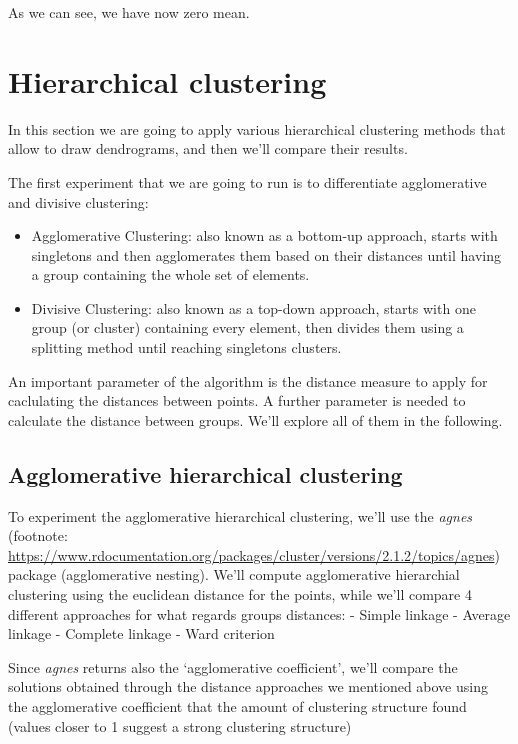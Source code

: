\documentclass[
]{article}
\providecommand{\tightlist}{%
  \setlength{\itemsep}{0pt}\setlength{\parskip}{0pt}}
\begin{document}
As we can see, we have now zero mean.

\hypertarget{hierarchical-clustering}{%
\section{Hierarchical clustering}\label{hierarchical-clustering}}

In this section we are going to apply various hierarchical clustering
methods that allow to draw dendrograms, and then we'll compare their
results.

The first experiment that we are going to run is to differentiate
agglomerative and divisive clustering:

\begin{itemize}
\tightlist
\item
  Agglomerative Clustering: also known as a bottom-up approach, starts
  with singletons and then agglomerates them based on their distances
  until having a group containing the whole set of elements.
\item
  Divisive Clustering: also known as a top-down approach, starts with
  one group (or cluster) containing every element, then divides them
  using a splitting method until reaching singletons clusters.
\end{itemize}

An important parameter of the algorithm is the distance measure to apply
for caclulating the distances between points. A further parameter is
needed to calculate the distance between groups. We'll explore all of
them in the following.

\hypertarget{agglomerative-hierarchical-clustering}{%
\subsection{Agglomerative hierarchical
clustering}\label{agglomerative-hierarchical-clustering}}

To experiment the agglomerative hierarchical clustering, we'll use the
\emph{agnes} (footnote:
\url{https://www.rdocumentation.org/packages/cluster/versions/2.1.2/topics/agnes})
package (agglomerative nesting). We'll compute agglomerative hierarchial
clustering using the euclidean distance for the points, while we'll
compare 4 different approaches for what regards groups distances: -
Simple linkage - Average linkage - Complete linkage - Ward criterion

Since \emph{agnes} returns also the `agglomerative coefficient', we'll
compare the solutions obtained through the distance approaches we
mentioned above using the agglomerative coefficient that the amount of
clustering structure found (values closer to 1 suggest a strong
clustering structure)
\end{document}
